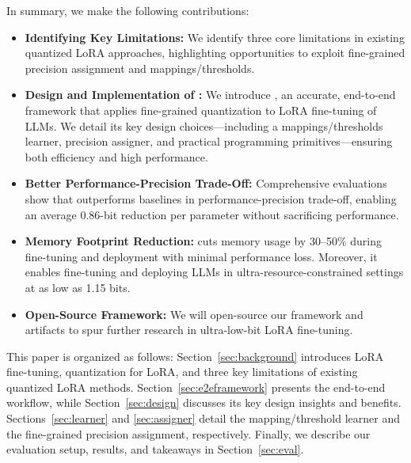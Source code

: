 In summary, we make the following contributions:
\begin{itemize}
    \item \textbf{Identifying Key Limitations:} We identify three core limitations in existing quantized LoRA approaches, highlighting opportunities to exploit fine-grained precision assignment and mappings/thresholds.
    \item \textbf{Design and Implementation of \FWName:} We introduce \FWName, an accurate, end-to-end framework that applies fine-grained quantization to LoRA fine-tuning of LLMs. 
    We detail its key design choices—including a mappings/thresholds learner, precision assigner, and practical programming primitives—ensuring both efficiency and high performance.
    \item \textbf{Better Performance-Precision Trade-Off:} Comprehensive evaluations show that \FWName outperforms baselines in performance-precision trade-off, enabling an average 0.86-bit reduction per parameter without sacrificing performance.
    \item \textbf{Memory Footprint Reduction:} \FWName cuts memory usage by 30–50\% during fine-tuning and deployment with minimal performance loss.
    Moreover, it enables fine-tuning and deploying LLMs in ultra-resource-constrained settings at as low as 1.15 bits. 
    \item \textbf{Open-Source Framework:} We will open-source our framework and artifacts to spur further research in ultra-low-bit LoRA fine-tuning.
\end{itemize}

This paper is organized as follows: Section~\ref{sec:background} introduces LoRA fine-tuning, quantization for LoRA, and three key limitations of existing quantized LoRA methods. Section~\ref{sec:e2eframework} presents the \FWName{} end-to-end workflow, while Section~\ref{sec:design} discusses its key design insights and benefits. Sections~\ref{sec:learner} and \ref{sec:assigner} detail the mapping/threshold learner and the fine-grained precision assignment, respectively. Finally, we describe our evaluation setup, results, and takeaways in Section~\ref{sec:eval}.
